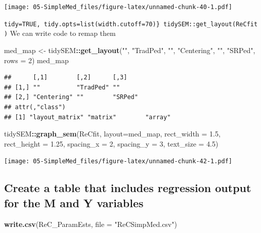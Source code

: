 \documentclass[
  11pt,
]{book}
\newenvironment{Shaded}{\begin{snugshade}}{\end{snugshade}}
\newcommand{\AttributeTok}[1]{\textcolor[rgb]{0.27,0.27,0.27}{#1}}
\newcommand{\DecValTok}[1]{\textcolor[rgb]{0.06,0.06,0.06}{#1}}
\newcommand{\FloatTok}[1]{\textcolor[rgb]{0.06,0.06,0.06}{#1}}
\newcommand{\FunctionTok}[1]{\textcolor[rgb]{0.27,0.27,0.27}{\textbf{#1}}}
\newcommand{\NormalTok}[1]{#1}
\newcommand{\OtherTok}[1]{\textcolor[rgb]{0.37,0.37,0.37}{#1}}
\newcommand{\SpecialCharTok}[1]{\textcolor[rgb]{0.43,0.43,0.43}{\textbf{#1}}}
\newcommand{\StringTok}[1]{\textcolor[rgb]{0.5,0.5,0.5}{#1}}
\begin{document}
\texttt{[image: 05-SimpleMed\_files/figure-latex/unnamed-chunk-40-1.pdf]}

\texttt{tidy=TRUE,\ tidy.opts=list(width.cutoff=70)\}\ tidySEM::get\_layout(ReCfit)} We can write code to remap them

\begin{Shaded}
\begin{Highlighting}[]
\NormalTok{med\_map }\OtherTok{\textless{}{-}}\NormalTok{ tidySEM}\SpecialCharTok{::}\FunctionTok{get\_layout}\NormalTok{(}\StringTok{""}\NormalTok{, }\StringTok{"TradPed"}\NormalTok{, }\StringTok{""}\NormalTok{, }\StringTok{"Centering"}\NormalTok{, }\StringTok{""}\NormalTok{, }\StringTok{"SRPed"}\NormalTok{,}
    \AttributeTok{rows =} \DecValTok{2}\NormalTok{)}
\NormalTok{med\_map}
\end{Highlighting}
\end{Shaded}

\begin{verbatim}
##      [,1]        [,2]      [,3]   
## [1,] ""          "TradPed" ""     
## [2,] "Centering" ""        "SRPed"
## attr(,"class")
## [1] "layout_matrix" "matrix"        "array"
\end{verbatim}

\begin{Shaded}
\begin{Highlighting}[]
\NormalTok{tidySEM}\SpecialCharTok{::}\FunctionTok{graph\_sem}\NormalTok{(ReCfit, }\AttributeTok{layout=}\NormalTok{med\_map,  }\AttributeTok{rect\_width =} \FloatTok{1.5}\NormalTok{, }\AttributeTok{rect\_height =} \FloatTok{1.25}\NormalTok{, }\AttributeTok{spacing\_x =} \DecValTok{2}\NormalTok{, }\AttributeTok{spacing\_y =} \DecValTok{3}\NormalTok{, }\AttributeTok{text\_size =} \FloatTok{4.5}\NormalTok{)}
\end{Highlighting}
\end{Shaded}

\texttt{[image: 05-SimpleMed\_files/figure-latex/unnamed-chunk-42-1.pdf]}

\hypertarget{create-a-table-that-includes-regression-output-for-the-m-and-y-variables}{%
\subsection*{Create a table that includes regression output for the M and Y variables}\label{create-a-table-that-includes-regression-output-for-the-m-and-y-variables}}


\begin{Shaded}
\begin{Highlighting}[]
\FunctionTok{write.csv}\NormalTok{(ReC\_ParamEsts, }\AttributeTok{file =} \StringTok{"ReCSimpMed.csv"}\NormalTok{)}
\end{Highlighting}
\end{Shaded}
\end{document}

